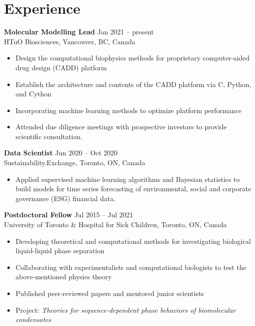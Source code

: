 \documentclass[11pt]{../yhlcv}
\begin{document}
\section*{Experience}

{\bf Molecular Modelling Lead}  \hfill Jan 2021 -- present \vspace{0.25em} \\
HTuO Biosciences, Vancouver, BC, Canada 
\vspace{-0.7em} \\
\begin{itemize}[leftmargin=*]\itemsep-0.2em
\item Design the computational biophysics methods for proprietary computer-aided drug design (CADD) platform
\item Establish the architecture and contents of the CADD platform via C, Python, and Cython
%
\item Incorporating machine learning methods to optimize platform performance
%
\item Attended due diligence meetings with prospective investors to provide scientific consultation.
\end{itemize}

{\bf Data Scientist} \hfill Jun 2020 -- Oct 2020 \vspace{0.25em} \\
Sustainability.Exchange, Toronto, ON, Canada
\vspace{-0.7em}\\
\begin{itemize}[leftmargin=*]\itemsep-0.2em
\item Applied supervised machine learning algorithms and Bayesian statistics to build models for time series
forecasting of environmental, social and corporate governance (ESG) financial data.
\end{itemize}

{\bf Postdoctoral Fellow} \hfill Jul 2015 -- Jul 2021 \vspace{0.25em} \\
University of Toronto \& Hospital for Sick Children, Toronto, ON, Canada
\vspace{-0.7em}\\
\begin{itemize}[leftmargin=*]\itemsep-0.2em
\item Developing theoretical and computational methods for investigating biological liquid-liquid phase separation
\item Collaborating with experimentalists and computational biologists to test the above-mentioned physics theory
\item Published peer-reviewed papers and mentored junior scientists 
\item Project: {\it Theories for sequence-dependent phase behaviors of biomolecular condensates}
\end{itemize}
\end{document}
